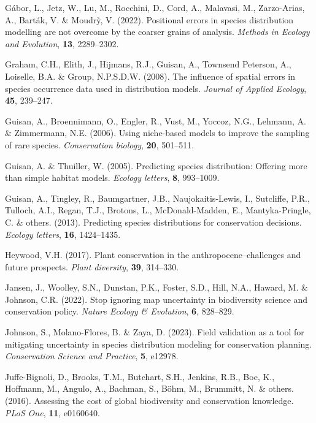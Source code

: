 \documentclass[
]{article}
\newlength{\cslhangindent}
\newenvironment{CSLReferences}[2] %
 {\begin{list}{}{%
  \setlength{\itemindent}{0pt}
  \setlength{\leftmargin}{0pt}
  \setlength{\parsep}{0pt}
  \ifodd #1
   \setlength{\leftmargin}{\cslhangindent}
   \setlength{\itemindent}{-1\cslhangindent}
  \fi
  \setlength{\itemsep}{#2\baselineskip}}}
 {\end{list}}
\begin{document}
\begin{CSLReferences}{1}{1}
Gábor, L., Jetz, W., Lu, M., Rocchini, D., Cord, A., Malavasi, M.,
Zarzo-Arias, A., Barták, V. \& Moudrỳ, V. (2022). Positional errors in
species distribution modelling are not overcome by the coarser grains of
analysis. \emph{Methods in Ecology and Evolution}, \textbf{13},
2289--2302.

Graham, C.H., Elith, J., Hijmans, R.J., Guisan, A., Townsend Peterson,
A., Loiselle, B.A. \& Group, N.P.S.D.W. (2008). The influence of spatial
errors in species occurrence data used in distribution models.
\emph{Journal of Applied Ecology}, \textbf{45}, 239--247.

Guisan, A., Broennimann, O., Engler, R., Vust, M., Yoccoz, N.G.,
Lehmann, A. \& Zimmermann, N.E. (2006). Using niche-based models to
improve the sampling of rare species. \emph{Conservation biology},
\textbf{20}, 501--511.

Guisan, A. \& Thuiller, W. (2005). Predicting species distribution:
Offering more than simple habitat models. \emph{Ecology letters},
\textbf{8}, 993--1009.

Guisan, A., Tingley, R., Baumgartner, J.B., Naujokaitis-Lewis, I.,
Sutcliffe, P.R., Tulloch, A.I., Regan, T.J., Brotons, L.,
McDonald-Madden, E., Mantyka-Pringle, C. \& others. (2013). Predicting
species distributions for conservation decisions. \emph{Ecology
letters}, \textbf{16}, 1424--1435.

Heywood, V.H. (2017). Plant conservation in the anthropocene--challenges
and future prospects. \emph{Plant diversity}, \textbf{39}, 314--330.

Jansen, J., Woolley, S.N., Dunstan, P.K., Foster, S.D., Hill, N.A.,
Haward, M. \& Johnson, C.R. (2022). Stop ignoring map uncertainty in
biodiversity science and conservation policy. \emph{Nature Ecology \&
Evolution}, \textbf{6}, 828--829.

Johnson, S., Molano-Flores, B. \& Zaya, D. (2023). Field validation as a
tool for mitigating uncertainty in species distribution modeling for
conservation planning. \emph{Conservation Science and Practice},
\textbf{5}, e12978.

Juffe-Bignoli, D., Brooks, T.M., Butchart, S.H., Jenkins, R.B., Boe, K.,
Hoffmann, M., Angulo, A., Bachman, S., Böhm, M., Brummitt, N. \& others.
(2016). Assessing the cost of global biodiversity and conservation
knowledge. \emph{PLoS One}, \textbf{11}, e0160640.


\end{CSLReferences}
\end{document}
